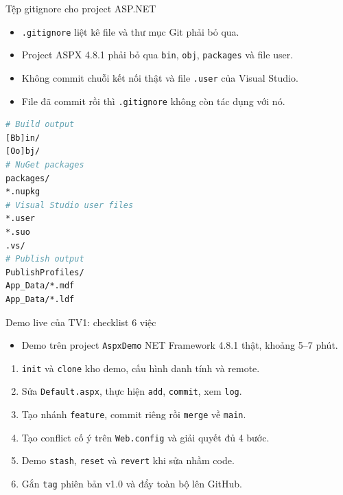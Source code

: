 \begin{frame}[fragile]{Tệp gitignore cho project ASP.NET}
\begin{itemize}
  \item \texttt{.gitignore} liệt kê file và thư mục Git phải bỏ qua.
  \item Project ASPX 4.8.1 phải bỏ qua \texttt{bin}, \texttt{obj}, \texttt{packages} và file user.
  \item Không commit chuỗi kết nối thật và file \texttt{.user} của Visual Studio.
  \item File đã commit rồi thì \texttt{.gitignore} không còn tác dụng với nó.
\end{itemize}
\begin{lstlisting}[language=bash]
# Build output
[Bb]in/
[Oo]bj/
# NuGet packages
packages/
*.nupkg
# Visual Studio user files
*.user
*.suo
.vs/
# Publish output
PublishProfiles/
App_Data/*.mdf
App_Data/*.ldf
\end{lstlisting}
\end{frame}

\begin{frame}{Demo live của TV1: checklist 6 việc}
\begin{itemize}
  \item Demo trên project \texttt{AspxDemo} NET Framework 4.8.1 thật, khoảng 5--7 phút.
\end{itemize}
\begin{enumerate}
  \item \texttt{init} và \texttt{clone} kho demo, cấu hình danh tính và remote.
  \item Sửa \texttt{Default.aspx}, thực hiện \texttt{add}, \texttt{commit}, xem \texttt{log}.
  \item Tạo nhánh \texttt{feature}, commit riêng rồi \texttt{merge} về \texttt{main}.
  \item Tạo conflict cố ý trên \texttt{Web.config} và giải quyết đủ 4 bước.
  \item Demo \texttt{stash}, \texttt{reset} và \texttt{revert} khi sửa nhầm code.
  \item Gắn \texttt{tag} phiên bản v1.0 và đẩy toàn bộ lên GitHub.
\end{enumerate}
\end{frame}
